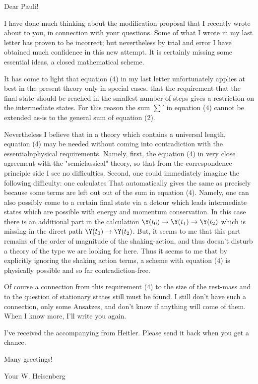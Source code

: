 \date{February 14, 1937}

Dear Pauli!

I have done much thinking about the modification proposal that I recently wrote about to you, in connection with your questions. Some of what I wrote in my last letter has proven to be incorrect; but nevertheless by trial and error I have obtained much confidence in this new attempt. It is certainly missing some essential ideas,  a closed mathematical scheme.

It has come to light that equation (4) in my last letter unfortunately applies at best in the present theory only in special cases.  that the requirement that the final state should be reached in the smallest number of steps gives a restriction on the intermediate states. For this reason the sum $\sum'$ in equation (4) cannot be extended as-is to the general sum of equation (2).

Nevertheless I believe that in a theory which contains a universal length, equation (4) may be needed without coming into contradiction with the essentialnphysical requirements. Namely, first, the equation (4) in very close agreement with the "semiclassical" theory, so that from the correspondence principle side I see no difficulties. Second, one could immediately imagine the following difficulty: one calculates
That automatically gives the same as
precisely because some terms are left out out of the sum in equation (4). Namely, one can also possibly come to a certain final state via a detour which leads  intermediate states which are possible with energy and momentum conservation. In this case there is an additional part in the calculation $\Y(t_0)\to \Y(t_1) \to \Y(t_2)$ which is missing in the direct path $\Y(t_0)\to\Y(t_2)$. But, it seems to me that this part remains of the order of magnitude of the shaking-action, and thus doesn't disturb a theory of the type we are looking for here. Thus it seems to me that by explicitly ignoring the shaking action terms, a scheme with equation (4) is physically possible and so far contradiction-free.

Of course a connection from this requirement (4) to the size of the rest-mass and to the question of stationary states still must be found. I still don't have such a connection, only some Ansatzes, and don't know if anything will come of them. When I know more, I'll write you again.

I've received the accompanying  from Heitler. Please send it back when you get a chance.

Many greetings!

Your W. Heisenberg

